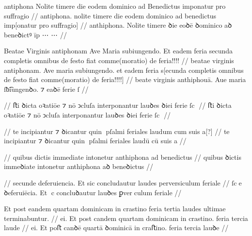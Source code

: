 \ex \bg
\gla
{}
antiphona Nolite timere die eodem dominico ad Benedictus imponatur pro suffragio 
//
\glRekonstrukcja
{}
antiphona. nolite timere die eodem dominico ad benedictus imp[onatur pro suffragio] 
//
\glU
{}
anthiphona. Nolite timere ꝺie eoꝺē ꝺominico aꝺ beneꝺictꝰ īp ⋯ ⋯
//
\endgl
\xe



\ex \bg
\gla
{}
Beatae Virginis antiphonam Ave Maria
subiungendo. Et eadem feria secunda completis omnibus de festo fiat
comme(moratio) de feria!!!!
//
\glRekonstrukcja
{}
beatae virginis antiphonam. Ave maria
subiungendo. et eadem feria s[ecunda completis omnibus de festo fiat
comme(moratio) de feria!!!!]
//
\glU
{}
beate virginis anthiphouā. Aue maria ſƀ͡iungenꝺo. ⁊ eaꝺē ferie ſ
//
\endgl
\xe



\ex \bg
\gla
{}
{} {} {} {} {} {} {} {} {} {}
{} {} {} {} {} {} {} {} {} {}
//
\glRekonstrukcja
{}ﬅi ꝺicta oꝛatiōe ⁊ nō ↄcluſa interponantur lauꝺes ꝺiei ferie ſc
//
\glU
{}
ﬅi ꝺicta oꝛatiōe ⁊ nō ↄcluſa interponantur lauꝺes ꝺiei ferie ſc
//
\endgl
\xe


\ex \bg
\gla
{}
{} {} {} {} {} {} {} {} {} {}
{} {} {} {} {} {} {} {} {} {}
//
\glRekonstrukcja
te incipiantur ⁊ ꝺicantur quin pſalmi feriales laudum cum suis a[?]
//
\glU
{}
te incipiantur ⁊ ꝺicantur quin pſalmi feriales laudū cū suis a
//
\endgl
\xe

\ex \bg
\gla
{}
{}
{} {} {} {} {} {} {} {} {} {}
{} {} {} {} {} {} {} {} {} {}
//
\glRekonstrukcja
quibus dictis immediate intonetur anthiphona ad benedictus
//
\glU
{}
quibus ꝺictis immeꝺiate intonetur anthiphona aꝺ beneꝺictus
//
\endgl
\xe


\ex \bg
\gla
{}
{} {} {} {} {} {} {} {} {} {}
{} {} {} {} {} {} {} {} {} {}
//
\glRekonstrukcja
secunde deferuiencia. Et sic concludautur laudes perversiculum feriale
//
\glU
{}
ſce ꝺeferuiēcia. Et c concluꝺautur lauꝺes ꝑverculum feriale
//
\endgl
\xe



\ex \bg
\gla
{}
{} Et post eandem quartam dominicam in crastino feria tertia laudes
ultimae terminabuntur.
//
\glRekonstrukcja
{}
ei. Et post candem quartam dominicam in crastino. feria tercia laude
//
\glU
{}
ei. Et poﬅ canꝺē quartā ꝺominicā in craﬅino. feria tercia lauꝺe
//
\endgl
\xe




